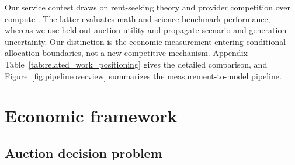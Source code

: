 \documentclass{article}
\begin{document}
Our service contest draws on rent-seeking theory \citep{tullock1980efficient} and provider competition over compute \citep{artola2026games}. The latter evaluates math and science benchmark performance, whereas we use held-out auction utility and propagate scenario and generation uncertainty. Our distinction is the economic measurement entering conditional allocation boundaries, not a new competitive mechanism. Appendix Table~\ref{tab:related_work_positioning} gives the detailed comparison, and Figure~\ref{fig:pipelineoverview} summarizes the measurement-to-model pipeline.

\section{Economic framework}

\subsection{Auction decision problem}
\end{document}
